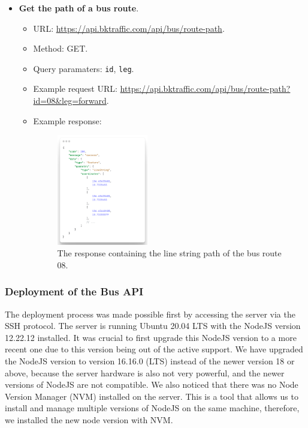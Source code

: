 \begin{itemize}
    \item \textbf{Get the path of a bus route}.
    \begin{itemize}
        \item URL: \url{https://api.bktraffic.com/api/bus/route-path}.
        \item Method: GET.
        \item Query paramaters: \lstinline{id}, \lstinline{leg}.
        \item Example request URL: \url{https://api.bktraffic.com/api/bus/route-path?id=08&leg=forward}.
        \item Example response:
        \begin{figure}[H]
            \centering
            \includegraphics[width=0.4\textwidth]{assets/images/Implementation/route_path_response.png}
            \caption{The response containing the line string path of the bus route 08.}
            \label{fig:route_path_response}
        \end{figure}
    \end{itemize} 
\end{itemize}

\subsubsection{Deployment of the Bus API}
The deployment process was made possible first by accessing the server via the SSH protocol. The server is running Ubuntu 20.04 LTS with the NodeJS version 12.22.12 installed. It was crucial to first upgrade this NodeJS version to a more recent one due to this version being out of the active support. We have upgraded the NodeJS version to version 16.16.0 (LTS) instead of the newer version 18 or above, because the server hardware is also not very powerful, and the newer versions of NodeJS are not compatible. We also noticed that there was no Node Version Manager (NVM) installed on the server. This is a tool that allows us to install and manage multiple versions of NodeJS on the same machine, therefore, we installed the new node version with NVM.


